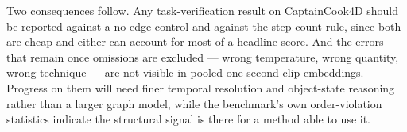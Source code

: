 \documentclass[10pt,twocolumn,letterpaper]{article}
\begin{document}
Two consequences follow. Any task-verification result on CaptainCook4D should be
reported against a no-edge control and against the step-count rule, since both are
cheap and either can account for most of a headline score. And the errors that
remain once omissions are excluded --- wrong temperature, wrong quantity, wrong
technique --- are not visible in pooled one-second clip embeddings. Progress on them
will need finer temporal resolution and object-state reasoning rather than a larger
graph model, while the benchmark's own order-violation statistics indicate the
structural signal is there for a method able to use it.

{\small


}
\end{document}
